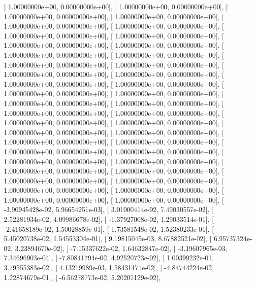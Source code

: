 \documentclass{article}
\begin{document}
       [  1.00000000e+00,   0.00000000e+00],
       [  1.00000000e+00,   0.00000000e+00],
       [  1.00000000e+00,   0.00000000e+00],
       [  1.00000000e+00,   0.00000000e+00],
       [  1.00000000e+00,   0.00000000e+00],
       [  1.00000000e+00,   0.00000000e+00],
       [  1.00000000e+00,   0.00000000e+00],
       [  1.00000000e+00,   0.00000000e+00],
       [  1.00000000e+00,   0.00000000e+00],
       [  1.00000000e+00,   0.00000000e+00],
       [  1.00000000e+00,   0.00000000e+00],
       [  1.00000000e+00,   0.00000000e+00],
       [  1.00000000e+00,   0.00000000e+00],
       [  1.00000000e+00,   0.00000000e+00],
       [  1.00000000e+00,   0.00000000e+00],
       [  1.00000000e+00,   0.00000000e+00],
       [  1.00000000e+00,   0.00000000e+00],
       [  1.00000000e+00,   0.00000000e+00],
       [  1.00000000e+00,   0.00000000e+00],
       [  1.00000000e+00,   0.00000000e+00],
       [  1.00000000e+00,   0.00000000e+00],
       [  1.00000000e+00,   0.00000000e+00],
       [  1.00000000e+00,   0.00000000e+00],
       [  1.00000000e+00,   0.00000000e+00],
       [  1.00000000e+00,   0.00000000e+00],
       [  1.00000000e+00,   0.00000000e+00],
       [  1.00000000e+00,   0.00000000e+00],
       [  1.00000000e+00,   0.00000000e+00],
       [  1.00000000e+00,   0.00000000e+00],
       [  1.00000000e+00,   0.00000000e+00],
       [  1.00000000e+00,   0.00000000e+00],
       [  1.00000000e+00,   0.00000000e+00],
       [  1.00000000e+00,   0.00000000e+00],
       [  1.00000000e+00,   0.00000000e+00],
       [  1.00000000e+00,   0.00000000e+00],
       [  1.00000000e+00,   0.00000000e+00],
       [  1.00000000e+00,   0.00000000e+00],
       [  1.00000000e+00,   0.00000000e+00],
       [  1.00000000e+00,   0.00000000e+00],
       [  1.00000000e+00,   0.00000000e+00],
       [  1.00000000e+00,   0.00000000e+00],
       [  1.00000000e+00,   0.00000000e+00],
       [ -3.90945428e-02,   5.96654251e-03],
       [  3.01000414e-02,   7.49030557e-02],
       [  2.52281934e-02,   4.09986678e-02],
       [ -1.37927008e-02,   1.29033514e-01],
       [ -2.41658189e-02,   1.50028859e-01],
       [  1.73581548e-02,   1.52380233e-01],
       [  5.45020738e-02,   1.54553304e-01],
       [  9.19815045e-03,   8.67882521e-02],
       [  6.95737324e-02,   3.23894670e-02],
       [ -7.15337622e-02,   1.64632847e-02],
       [ -3.19607965e-03,   7.34696903e-04],
       [ -7.80841794e-02,   4.92520723e-02],
       [  1.00399232e-01,   3.79555383e-02],
       [  4.13219989e-03,   1.58431471e-02],
       [ -4.84744224e-02,   1.22874679e-01],
       [ -6.56278773e-02,   5.20207129e-02],
\end{document}
